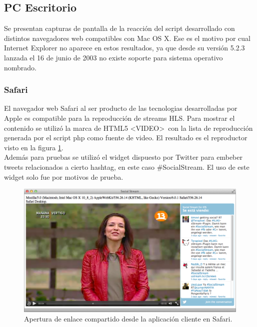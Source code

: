  \subsection{PC Escritorio}
  Se presentan capturas de pantalla de la reacción del script desarrollado con distintos navegadores web compatibles con Mac OS X. Ese es el motivo por cual Internet Explorer no aparece en estos resultados, ya que desde su versión 5.2.3 lanzada el 16 de junio de 2003 \cite{bib:mac-iexplorer} no existe soporte para sistema operativo nombrado.

    \subsubsection{Safari}
El navegador web Safari al ser producto de las tecnologias desarrolladas por Apple es compatible para la reproducción de streams HLS. Para mostrar el contenido se utilizó la marca de HTML5  \textless VIDEO\textgreater \ con la lista de reproducción generada por el script php como fuente de video. El resultado es el reproductor visto en la figura \ref{fig:uagent-safari}.\\

Además para pruebas se utilizó el widget dispuesto por Twitter \cite{bib:twitter-widget} para embeber tweets relacionados a cierto hashtag, en este caso \#SocialStream. El uso de este widget solo fue por motivos de prueba.

  \begin{figure}[H]
	\centering
	\includegraphics[scale=0.4]{imgs/uagent-safari.png} 
	\caption{Apertura de enlace compartido desde la aplicación cliente en Safari.}
	\label{fig:uagent-safari}
\end{figure}  
    
